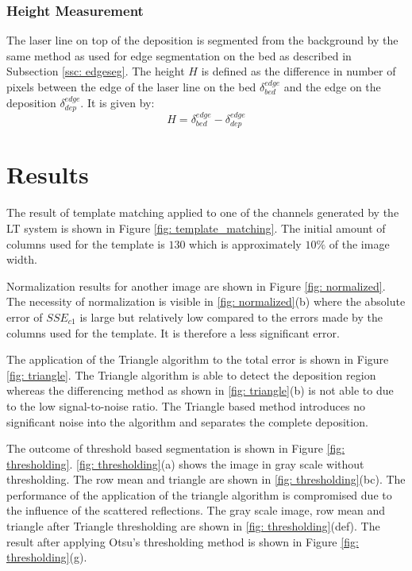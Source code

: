 \documentclass[10pt,letter]{article}
\begin{document}
\subsubsection{Height Measurement}
The laser line on top of the deposition is segmented from the background by the same method as used for edge segmentation on the bed as described in Subsection \ref{ssc: edgeseg}. The height $H$ is defined as the difference in number of pixels between the edge of the laser line on the bed $\delta^{edge}_{bed}$ and the edge on the deposition $\delta^{edge}_{dep}$. It is given by: 
\begin{equation}
H = \delta^{edge}_{bed}-\delta^{edge}_{dep}
\end{equation}

\section{Results}
The result of template matching applied to one of the channels generated by the LT system is shown in Figure \ref{fig: template_matching}. The initial amount of columns used for the template is $130$ which is approximately $10\%$ of the image width. 

Normalization results for another image are shown in Figure \ref{fig: normalized}. The necessity of normalization is visible in \ref{fig: normalized}(b) where the absolute error of $SSE_{c1}$ is large but relatively low compared to the errors made by the columns used for the template. It is therefore a less significant error. 

The application of the Triangle algorithm to the total error is shown in Figure \ref{fig: triangle}. The Triangle algorithm is able to detect the deposition region whereas the differencing method as shown in \ref{fig: triangle}(b) is not able to due to the low signal-to-noise ratio.  The Triangle based method introduces no significant noise into the algorithm and separates the complete deposition.

The outcome of threshold based segmentation is shown in Figure \ref{fig: thresholding}. \ref{fig: thresholding}(a) shows the image in gray scale without thresholding. The row mean and triangle are shown in \ref{fig: thresholding}(bc). The performance of the application of the triangle algorithm is compromised due to the influence of the scattered reflections. The gray scale image, row mean and triangle after Triangle thresholding are shown in \ref{fig: thresholding}(def). The result after applying Otsu's thresholding method is shown in Figure \ref{fig: thresholding}(g). 
\end{document}
